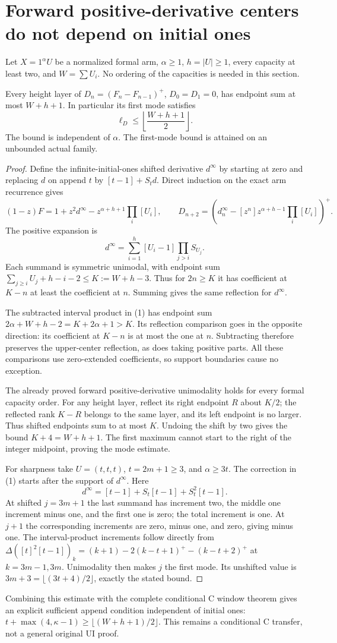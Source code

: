 \section{Forward positive-derivative centers do not depend on initial ones}
Let $X=1^\alpha U$ be a normalized formal arm, $\alpha\ge1$,
$h=|U|\ge1$, every capacity at least two, and $W=\sum U_i$.
No ordering of the capacities is needed in this section.

\begin{theorem}
Every height layer of $D_n=(F_n-F_{n-1})^+$, $D_0=D_1=0$,
has endpoint sum at most $W+h+1$. In particular its first mode
satisfies
\[
                         \ell_D\le\left\lfloor\frac{W+h+1}{2}\right\rfloor.
\]
The bound is independent of $\alpha$. The first-mode bound is
attained on an unbounded actual family.
\end{theorem}
\begin{proof}
Define the infinite-initial-ones shifted derivative $d^\infty$
by starting at zero and replacing $d$ on append $t$ by
$[t-1]+S_td$. Direct induction on the exact arm recurrence gives
\[
 (1-z)F=1+z^2d^\infty-z^{\alpha+h+1}\prod_i[U_i],
 \qquad
 D_{n+2}=\left(d^\infty_n-[z^n]z^{\alpha+h-1}\prod_i[U_i]\right)^+.
                                                               \tag{1}
\]
The positive expansion is
\[
        d^\infty=\sum_{i=1}^h [U_i-1]\prod_{j>i}S_{U_j}.
\]
Each summand is symmetric unimodal, with endpoint sum
$\sum_{j\ge i}U_j+h-i-2\le K:=W+h-3$.
Thus for $2n\ge K$ it has coefficient at $K-n$ at least
the coefficient at $n$. Summing gives the same reflection
for $d^\infty$.

The subtracted interval product in (1) has endpoint sum
$2\alpha+W+h-2=K+2\alpha+1>K$.
Its reflection comparison goes in the opposite direction:
its coefficient at $K-n$ is at most the one at $n$.
Subtracting therefore preserves the upper-center reflection,
as does taking positive parts.
All these comparisons use zero-extended coefficients, so
support boundaries cause no exception.

The already proved forward positive-derivative unimodality
holds for every formal capacity order. For any height layer,
reflect its right endpoint $R$ about $K/2$; the reflected rank
$K-R$ belongs to the same layer, and its left endpoint is no
larger. Thus shifted endpoints sum to at most $K$.
Undoing the shift by two gives the bound $K+4=W+h+1$.
The first maximum cannot start to the right of the integer
midpoint, proving the mode estimate.

For sharpness take $U=(t,t,t)$, $t=2m+1\ge3$, and
$\alpha\ge3t$. The correction in (1) starts after the support
of $d^\infty$. Here
\[
 d^\infty=[t-1]+S_t[t-1]+S_t^2[t-1].
\]
At shifted $j=3m+1$ the last summand has increment two,
the middle one increment minus one, and the first one is zero;
the total increment is one. At $j+1$ the corresponding
increments are zero, minus one, and zero, giving minus one.
The interval-product increments follow directly from
$\Delta([t]^2[t-1])_k=(k+1)-2(k-t+1)^+-(k-t+2)^+$
at $k=3m-1,3m$. Unimodality then makes $j$ the first mode.
Its unshifted value is $3m+3=\lfloor(3t+4)/2\rfloor$,
exactly the stated bound.
\end{proof}

Combining this estimate with the complete conditional C window
theorem gives an explicit sufficient append condition independent
of initial ones:
$t+\max(4,\kappa-1)\ge\lfloor(W+h+1)/2\rfloor$.
This remains a conditional C transfer, not a general original UI proof.
